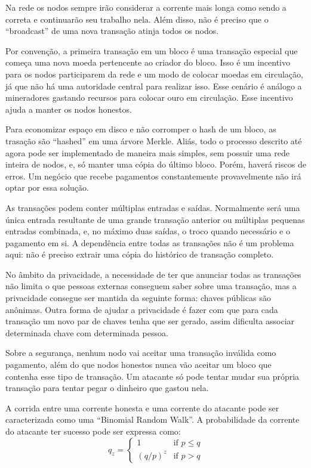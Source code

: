 \documentclass[12pt]{article}
\begin{document}
Na rede os nodos sempre irão considerar a corrente mais longa como sendo a
correta e continuarão seu trabalho nela. Além disso, não é preciso que o
``broadcast'' de uma nova transação atinja todos os nodos.

Por convenção, a primeira transação em um bloco é uma transação especial que
começa uma nova moeda pertencente ao criador do bloco. Isso é um incentivo para
os nodos participarem da rede e um modo de colocar moedas em circulação, já que
não há uma autoridade central para realizar isso. Esse cenário é análogo a
mineradores gastando recursos para colocar ouro em circulação. Esse incentivo
ajuda a manter os nodos honestos.

Para economizar espaço em disco e não corromper o hash de um bloco, as trasação
são ``hashed'' em uma árvore Merkle. Aliás, todo o processo descrito até agora
pode ser implementado de maneira mais simples, sem possuir uma rede inteira de
nodos, e, só manter uma cópia do último bloco. Porém, haverá riscos de erros. Um
negócio que recebe pagamentos constantemente provavelmente não irá optar por
essa solução.

As transações podem conter múltiplas entradas e saídas. Normalmente será uma
única entrada resultante de uma grande transação anterior ou múltiplas pequenas
entradas combinada, e, no máximo duas saídas, o troco quando necessário e o
pagamento em si. A dependência entre todas as transações não é um problema aqui:
não é preciso extrair uma cópia do histórico de transação completo.

No âmbito da privacidade, a necessidade de ter que anunciar todas as transações
não limita o que pessoas externas conseguem saber sobre uma transação, mas a
privacidade consegue ser mantida da seguinte forma: chaves públicas são
anônimas. Outra forma de ajudar a privacidade é  fazer com que para cada
transação um novo par de chaves tenha que ser gerado, assim dificulta associar
determinada chave com determinada pessoa.

Sobre a segurança, nenhum nodo vai aceitar uma transação inválida como
pagamento, além do que nodos honestos nunca vão aceitar um bloco que contenha
esse tipo de transação. Um atacante só pode tentar mudar sua própria transação
para tentar pegar o dinheiro que gastou nela.

A corrida entre uma corrente honesta e uma corrente do atacante pode ser
caracterizada como uma ``Binomial Random Walk''. A probabilidade da corrente do
atacante ter sucesso pode ser expressa como:
\begin{equation}
    q_z = \begin{cases}
            1         & \text{if } p \leq q \\
            (q / p)^z & \text{if } p > q
          \end{cases}
\end{equation}
\end{document}
